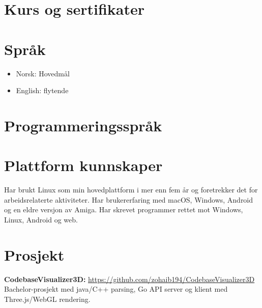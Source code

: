 \documentclass[norsk]{crudecv/crudecv}
\begin{document}
\section*{Kurs og sertifikater}
\begin{experiences}
\end{experiences}

\section*{Språk}
\begin{itemize}
    \item Norsk: Hovedmål
    \item English: flytende
\end{itemize}


\section*{Programmeringsspråk}
\begin{skills}
\end{skills}


\section*{Plattform kunnskaper}
Har brukt Linux som min hovedplattform i mer enn fem år og foretrekker det for arbeidsrelaterte aktiviteter. Har brukererfaring med macOS, Windows, Android og en eldre versjon av Amiga. Har skrevet programmer rettet mot Windows, Linux, Android og web.

\section*{Prosjekt}
\textbf{CodebaseVisualizer3D:} \hfill \href{https://github.com/zohaib194/CodebaseVisualizer3D}{https://github.com/zohaib194/CodebaseVisualizer3D} \\
Bachelor-prosjekt med java/C++ parsing, Go API server og klient med Three.js/WebGL rendering.
\end{document}
